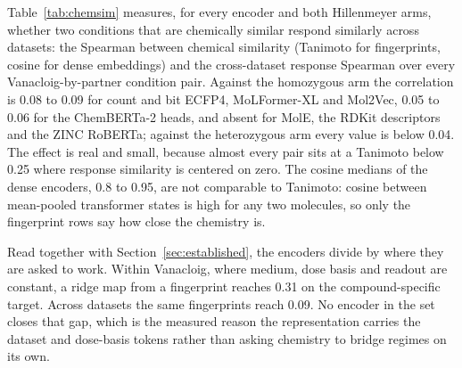 Table~\ref{tab:chemsim} measures, for every encoder and both Hillenmeyer arms, whether two
conditions that are chemically similar respond similarly across datasets: the Spearman
between chemical similarity (Tanimoto for fingerprints, cosine for dense embeddings) and the
cross-dataset response Spearman over every Vanacloig-by-partner condition pair. Against the
homozygous arm the correlation is 0.08 to 0.09 for count and bit ECFP4, MoLFormer-XL and
Mol2Vec, 0.05 to 0.06 for the ChemBERTa-2 heads, and absent for MolE, the RDKit descriptors
and the ZINC RoBERTa; against the heterozygous arm every value is below 0.04. The effect is
real and small, because almost every pair sits at a Tanimoto below 0.25 where response
similarity is centered on zero. The cosine medians of the dense encoders, 0.8 to 0.95, are not
comparable to Tanimoto: cosine between mean-pooled transformer states is high for any two
molecules, so only the fingerprint rows say how close the chemistry is.

\begin{table}[htbp]
\centering
\footnotesize
\caption{Per encoder and Hillenmeyer arm: the median similarity of each Vanacloig compound
to its nearest partner compound, the Spearman between chemical similarity and cross-dataset
response Spearman over every condition pair with its $p$ value, and the median response
Spearman of the top decile of pairs by chemistry against the rest.}
\label{tab:chemsim}

\end{table}

Read together with Section~\ref{sec:established}, the encoders divide by where they are
asked to work. Within Vanacloig, where medium, dose basis and readout are constant, a ridge
map from a fingerprint reaches 0.31 on the compound-specific target. Across datasets the same
fingerprints reach 0.09. No encoder in the set closes that gap, which is the measured reason
the representation carries the dataset and dose-basis tokens rather than asking chemistry to
bridge regimes on its own.
